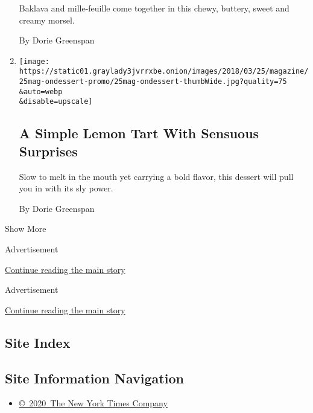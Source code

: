 \begin{enumerate}
  Baklava and mille-feuille come together in this chewy, buttery, sweet
  and creamy morsel.

  By Dorie Greenspan
\item
  \href{/2018/03/20/magazine/simple-lemon-tart-sweet-crust-recipe.html}{}

  \texttt{[image: https://static01.graylady3jvrrxbe.onion/images/2018/03/25/magazine/25mag-ondessert-promo/25mag-ondessert-thumbWide.jpg?quality=75\\\&auto=webp\\\&disable=upscale]}

  \hypertarget{a-simple-lemon-tart-with-sensuous-surprises}{%
  \subsection{A Simple Lemon Tart With Sensuous
  Surprises}\label{a-simple-lemon-tart-with-sensuous-surprises}}

  Slow to melt in the mouth yet carrying a bold flavor, this dessert
  will pull you in with its sly power.

  By Dorie Greenspan
\end{enumerate}

Show More

Advertisement

\protect\hyperlink{after-mid1}{Continue reading the main story}

Advertisement

\protect\hyperlink{after-mktg}{Continue reading the main story}

\hypertarget{site-index}{%
\subsection{Site Index}\label{site-index}}

\hypertarget{site-information-navigation}{%
\subsection{Site Information
Navigation}\label{site-information-navigation}}

\begin{itemize}
\tightlist
\item
  \href{https://help.nytimes3xbfgragh.onion/hc/en-us/articles/115014792127-Copyright-notice}{©~2020~The
  New York Times Company}
\end{itemize}

